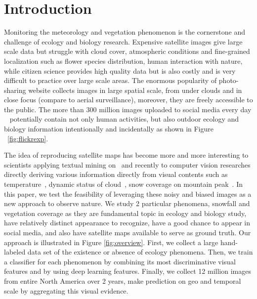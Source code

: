 \section{Introduction}

Monitoring the meteorology and vegetation phenomenon is the cornerstone and challenge of ecology and biology research. Expensive satellite images give large scale data but struggle with cloud cover, 
atmospheric conditions and fine-grained localization such as flower species distribution, human interaction with nature,
while citizen science provides high quality data but is also costly and is very difficult to practice over large scale areas.
The enormous popularity of photo-sharing website collects images in large spatial scale, from under clouds and in close focus (compare to aerial surveillance), 
moreover, they are freely accessible to the public.
The more than 300 million images uploaded to social media every day ~\cite{facebookstatistics}
 potentially contain not only human activities, but also outdoor ecology and biology 
information intentionally and incidentally as shown in Figure ~\ref{fig:flickrexp}.

The idea of reproducing satellite maps has become more and more interesting to scientists applying 
textual mining on~\cite{bollen11twitter,ecology2012www,you2015multifacetedelections,wood2013usingtourism} 
and recently to computer vision researches directly deriving various information directly from visual contents such as
 temperature~\cite{glasner2015hot}, dynamic status of cloud~\cite{murdock}, snow coverage on mountain peak~\cite{fedorov2015snowwatch, fedorov2014snow}.
In this paper, we test the feasibility of leveraging these noisy and biased images as a new 
approach to observe nature. We study 2 particular phenomena, snowfall and vegetation 
coverage as they are fundamental topic in ecology and biology study, have relatively 
distinct appearance to recognize, have a good chance to appear in social media, 
and also have satellite maps available to serve as ground truth. Our approach is 
illustrated in Figure \ref{fig:overview}. 
First, we collect a large hand-labeled data set of the existence or absence of ecology phenomena. 
Then, we train a classifier for each phenomenon by combining its most discriminative visual 
features and by using deep learning features. 
Finally, we collect 12 million images from entire North America over 2 years, make prediction 
on geo and temporal scale by aggregating this visual evidence.

